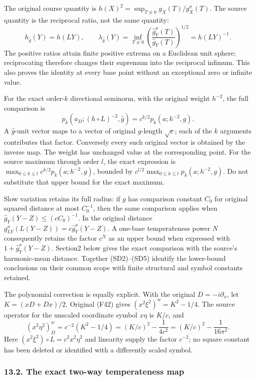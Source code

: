 \documentclass[
  11pt,
]{article}
\begin{document}
The original course quantity is
\(h(X)^2=\sup_{T\ne0}g_X(T)/g_X^\sigma(T)\). The source quantity is the
reciprocal ratio, not the same quantity: \[
 h_{\widehat g}(Y)=h(LY),\qquad
 \lambda_{\widehat g}(Y)
 =\inf_{T\ne0}\left(\frac{\widehat g_Y^\sigma(T)}{\widehat g_Y(T)}\right)^{1/2}
 =h(LY)^{-1}.
 \tag{SD4}
\] The positive ratios attain finite positive extrema on a Euclidean
unit sphere; reciprocating therefore changes their supremum into the
reciprocal infimum. This also proves the identity at every base point
without an exceptional zero or infinite value.

For the exact order-\(k\) directional seminorm, with the original weight
\(h^{-2}\), the full comparison is \[
 p_k(a_D;(h\circ L)^{-2},\widehat g)
 =c^{k/2}p_k(a;h^{-2},g).
 \tag{SD5}
\] A \(\widehat g\)-unit vector maps to a vector of original
\(g\)-length \(\sqrt c\); each of the \(k\) arguments contributes that
factor. Conversely every such original vector is obtained by the inverse
map. The weight has unchanged value at the corresponding point. For the
source maximum through order \(l\), the exact expression is
\(\max_{0\le k\le l}c^{k/2}p_k(a;h^{-2},g)\), bounded by
\(c^{l/2}\max_{0\le k\le l}p_k(a;h^{-2},g)\). Do not substitute that
upper bound for the exact maximum.

Slow variation retains its full radius: if \(g\) has comparison constant
\(C_0\) for original squared distance at most \(C_0^{-1}\), then the
same comparison applies when \(\widehat g_Y(Y-Z)\le(cC_0)^{-1}\). In the
original distance \(g_{LY}^\sigma(L(Y-Z))=c\widehat g_Y^\sigma(Y-Z)\). A
one-base temperateness power \(N\) consequently retains the factor
\(c^N\) as an upper bound when expressed with
\(1+\widehat g_Y^\sigma(Y-Z)\). Section2 below gives the exact
comparison with the source's harmonic-mean distance. Together
(SD2)--(SD5) identify the lower-bound conclusions on their common scope
with finite structural and symbol constants retained.

The polynomial correction is equally explicit. With the original
\(D=-i\partial_x\), let \(K=(xD+Dx)/2\). Original (F42) gives
\((x^2\xi^2)^w=K^2-1/4\). The source operator for the unscaled
coordinate symbol \(x\eta\) is \(K/c\), and \[
 (x^2\eta^2)^w_D=c^{-2}(K^2-1/4)
 =(K/c)^2-\frac{1}{4c^2}
 =(K/c)^2-\frac{1}{16\pi^2}.
 \tag{SD6}
\] Here \((x^2\xi^2)\circ L=c^2x^2\eta^2\) and linearity supply the
factor \(c^{-2}\); no square constant has been deleted or identified
with a differently scaled symbol.

\subsubsection{13.2. The exact two-way temperateness
map}\label{the-exact-two-way-temperateness-map}
\end{document}
